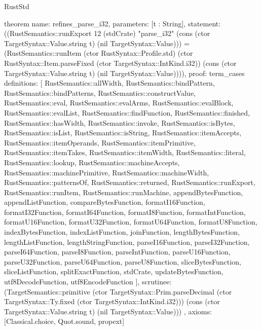 \begin{lexlean}{RustStd}
\begin{semanticmodule}
theorem{
  name: refines_parse_i32,
  parameters: [t : String],
  statement: ((RustSemantics::runExport 12 (stdCrate) "parse_i32" (cons (ctor TargetSyntax::Value.string t) (nil TargetSyntax::Value))) = (RustSemantics::runItem (ctor RustSyntax::Profile.std) (ctor RustSyntax::Item.parseFixed (ctor TargetSyntax::IntKind.i32)) (cons (ctor TargetSyntax::Value.string t) (nil TargetSyntax::Value)))),
  proof: term_cases{
    definitions: [
      RustSemantics::allWidth,
      RustSemantics::bindPattern,
      RustSemantics::bindPatterns,
      RustSemantics::constructValue,
      RustSemantics::eval,
      RustSemantics::evalArms,
      RustSemantics::evalBlock,
      RustSemantics::evalList,
      RustSemantics::findFunction,
      RustSemantics::finished,
      RustSemantics::hasWidth,
      RustSemantics::invoke,
      RustSemantics::isBytes,
      RustSemantics::isList,
      RustSemantics::isString,
      RustSemantics::itemAccepts,
      RustSemantics::itemOperands,
      RustSemantics::itemPrimitive,
      RustSemantics::itemTakes,
      RustSemantics::itemWidth,
      RustSemantics::literal,
      RustSemantics::lookup,
      RustSemantics::machineAccepts,
      RustSemantics::machinePrimitive,
      RustSemantics::machineWidth,
      RustSemantics::patternsOf,
      RustSemantics::returned,
      RustSemantics::runExport,
      RustSemantics::runItem,
      RustSemantics::runMachine,
      appendBytesFunction,
      appendListFunction,
      compareBytesFunction,
      formatI16Function,
      formatI32Function,
      formatI64Function,
      formatI8Function,
      formatIntFunction,
      formatU16Function,
      formatU32Function,
      formatU64Function,
      formatU8Function,
      indexBytesFunction,
      indexListFunction,
      joinFunction,
      lengthBytesFunction,
      lengthListFunction,
      lengthStringFunction,
      parseI16Function,
      parseI32Function,
      parseI64Function,
      parseI8Function,
      parseIntFunction,
      parseU16Function,
      parseU32Function,
      parseU64Function,
      parseU8Function,
      sliceBytesFunction,
      sliceListFunction,
      splitExactFunction,
      stdCrate,
      updateBytesFunction,
      utf8DecodeFunction,
      utf8EncodeFunction
    ],
    scrutinee: (TargetSemantics::primitive (ctor TargetSyntax::Prim.parseDecimal (ctor TargetSyntax::Ty.fixed (ctor TargetSyntax::IntKind.i32))) (cons (ctor TargetSyntax::Value.string t) (nil TargetSyntax::Value)))
  },
  axioms: [Classical.choice, Quot.sound, propext]
}


\end{semanticmodule}
\end{lexlean}
